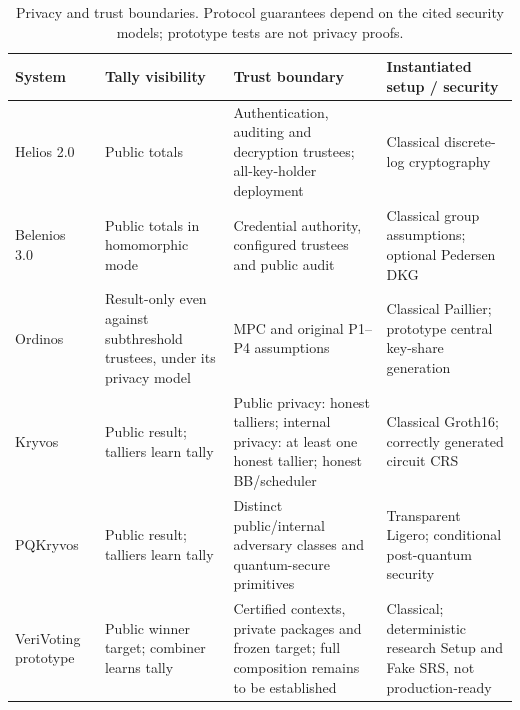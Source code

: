 \begin{table}[t]
\caption{Privacy and trust boundaries. Protocol guarantees depend on the cited security models; prototype tests are not privacy proofs.}
\label{tab:stage1-security}
\centering\small
\begin{tabularx}{\textwidth}{@{}>{\raggedright\arraybackslash}p{}*{3}{>{\raggedright\arraybackslash}X}@{}}
\toprule
System & Tally visibility & Trust boundary & Instantiated setup / security \\
\midrule
Helios 2.0~\cite{cmpHelios2009} & Public totals & Authentication, auditing and decryption trustees; all-key-holder deployment & Classical discrete-log cryptography \\
Belenios 3.0~\cite{cmpBelenios3} & Public totals in homomorphic mode & Credential authority, configured trustees and public audit & Classical group assumptions; optional Pedersen DKG \\
Ordinos~\cite{cmpOrdinos2020} & Result-only even against subthreshold trustees, under its privacy model & MPC and original P1--P4 assumptions & Classical Paillier; prototype central key-share generation \\
Kryvos~\cite{cmpKryvos2022} & Public result; talliers learn tally & Public privacy: honest talliers; internal privacy: at least one honest tallier; honest BB/scheduler & Classical Groth16; correctly generated circuit CRS \\
PQKryvos~\cite{cmpPQKryvos2026} & Public result; talliers learn tally & Distinct public/internal adversary classes and quantum-secure primitives & Transparent Ligero; conditional post-quantum security \\
VeriVoting prototype & Public winner target; combiner learns tally & Certified contexts, private packages and frozen target; full composition remains to be established & Classical; deterministic research Setup and Fake SRS, not production-ready \\
\bottomrule
\end{tabularx}
\end{table}
